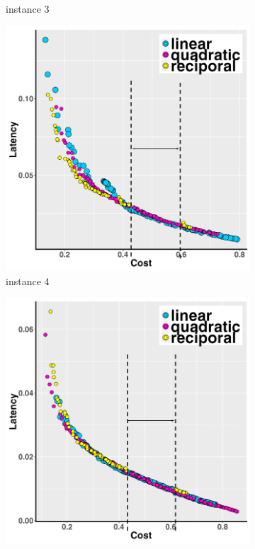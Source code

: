 \documentclass[10pt,journal,compsoc]{IEEEtran}
\begin{document}
\begin{figure}[h!]
\begin{subfigure}{0.49\linewidth}
    \caption{instance 3}
   \end{subfigure}
   \begin{subfigure}{0.49\linewidth}
       \includegraphics[width=\textwidth]{pics/dynamic_problem_4.png}
    \caption{instance 4}
   \end{subfigure}
   \begin{subfigure}{0.49\linewidth}
       \includegraphics[width=\textwidth]{pics/dynamic_problem_5.png}

\end{subfigure}
\end{figure}
\end{document}
